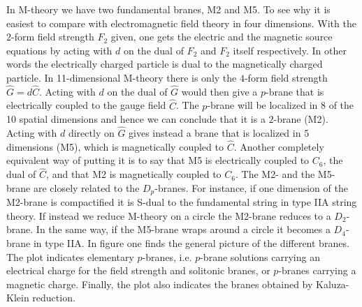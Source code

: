 In M-theory we have two fundamental branes, M2 and M5. To see why it is easiest to compare with electromagnetic field theory in four dimensions. 
With the $2$-form field strength $F_2$ given, one gets the electric and the magnetic source equations by acting with $d$ on the dual of $F_2$ and $F_2$ itself 
respectively. In other words the electrically charged particle is dual to the magnetically charged particle. In 11-dimensional M-theory there is 
only the $4$-form field strength $\hat{G}=d\hat{C}$. Acting with $d$ on the dual of $\hat{G}$ would then give a $p$-brane 
that is electrically coupled to the gauge field $\hat{C}$. The $p$-brane will be localized in 8 of the 10 spatial dimensions and hence we can conclude that it is a $2$-brane (M2).
Acting with $d$ directly on $\hat{G}$ gives instead a brane that is localized in 5 dimensions (M5), which is magnetically coupled to $\hat{C}$. 
Another completely equivalent way of putting it is to say that M5 is electrically coupled to $C_6$, the dual of $\hat{C}$, and that 
M2 is magnetically coupled to $C_6$. The M2- and the M5-brane are closely related to the $D_p$-branes. For instance, if one dimension 
of the M2-brane is compactified it is S-dual to the fundamental string in type IIA string theory. If instead we reduce M-theory on a circle the M2-brane 
reduces to a $D_2$-brane. In the same way, if the M5-brane wraps around a circle it becomes a $D_4$-brane in type IIA. In figure  one 
finds the general picture of the different branes. The plot indicates elementary $p$-branes, i.e. 
$p$-brane solutions carrying an electrical charge for the field strength and solitonic branes, or $p$-branes carrying 
a magnetic charge. Finally, the plot also indicates the branes obtained 
by Kaluza-Klein reduction\cite{supergrav_pbranes_lectures}.


\newcommand\kk{\circle*{1.5}}
\newcommand\soliton{\circle*{3}}
\newcommand\element{\circle{3}}

